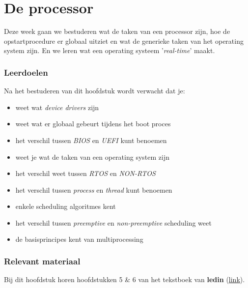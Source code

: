 \chapter{De processor}
\label{chap:processor}

Deze week gaan we bestuderen wat de taken van een processor zijn, hoe de opstartprocedure er globaal uitziet en wat de generieke taken van het operating system zijn. En we leren wat een operating systeem
'\textit{real-time}' maakt.

\subsection*{Leerdoelen}
Na het bestuderen van dit hoofdstuk wordt verwacht dat je:
\begin{itemize}
    \item[--] weet wat \textit{device drivers} zijn
    \item[--] weet wat er globaal gebeurt tijdens het boot proces
    \item[--] het verschil tussen \textit{BIOS} en \textit{UEFI} kunt benoemen
    \item[--] weet je wat de taken van een operating system zijn
    \item[--] het verschil weet tussen \textit{RTOS} en \textit{NON-RTOS}
    \item[--] het verschil tussen \textit{process} en \textit{thread} kunt benoemen
    \item[--] enkele scheduling algoritmes kent
    \item[--] het verschil tussen \textit{preemptive} en \textit{non-preemptive} scheduling weet
    \item[--] de basisprincipes kent van multiprocessing
\end{itemize}

\subsection*{Relevant materiaal}
Bij dit hoofdstuk horen hoofdstukken 5 \& 6 van het tekstboek van \textbf{ledin} (\href{https://learning.oreilly.com/library/view/modern-computer-architecture/9781803234519/Text/Chapter\_5.xhtml\#:-:text=5,Hardware-Software\%20Interface}{link}).



